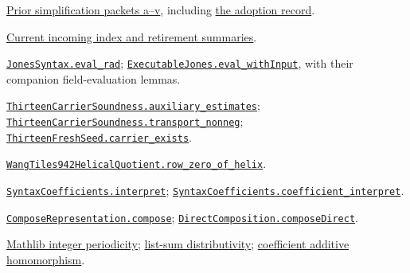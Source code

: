 \documentclass[11pt,letterpaper]{article}
\newcommand{\code}[1]{\nolinkurl{#1}}
\newcommand{\source}[2]{\href{https://github.com/VladimirReshetnikov/ProveIt/blob/efa64ca941cdae37bb6f7fc5093ae8bb69296ca3/Computability/DiophantineConsistency/Lean/DiophantineConsistency/#1.lean}{\code{#1.#2}}}
\begin{document}
\begin{enumerate}[label={[S\arabic*]},leftmargin=2.8em]
\item \href{https://github.com/VladimirReshetnikov/ProveIt/tree/efa64ca941cdae37bb6f7fc5093ae8bb69296ca3/Computability/DiophantineConsistency/research/lean-proof-simplification}{Prior simplification packets a--v}, including \href{https://github.com/VladimirReshetnikov/ProveIt/blob/efa64ca941cdae37bb6f7fc5093ae8bb69296ca3/Computability/DiophantineConsistency/research/lean-proof-simplification/ADOPTION.md}{the adoption record}.
\item \href{https://github.com/VladimirReshetnikov/ProveIt/blob/efa64ca941cdae37bb6f7fc5093ae8bb69296ca3/docs/incoming/README.md}{Current incoming index and retirement summaries}.
\item \source{JonesSyntax}{eval_rad}; \source{ExecutableJones}{eval_withInput}, with their companion field-evaluation lemmas.
\item \source{ThirteenCarrierSoundness}{auxiliary_estimates}; \source{ThirteenCarrierSoundness}{transport_nonneg}; \source{ThirteenFreshSeed}{carrier_exists}.
\item \source{WangTiles942HelicalQuotient}{row_zero_of_helix}.
\item \source{SyntaxCoefficients}{interpret}; \source{SyntaxCoefficients}{coefficient_interpret}.
\item \source{ComposeRepresentation}{compose}; \source{DirectComposition}{composeDirect}.
\item \href{https://github.com/leanprover-community/mathlib4/blob/81a5d257c8e410db227a6665ed08f64fea08e997/Mathlib/Algebra/Ring/Periodic.lean}{Mathlib integer periodicity}; \href{https://github.com/leanprover-community/mathlib4/blob/81a5d257c8e410db227a6665ed08f64fea08e997/Mathlib/Algebra/BigOperators/Ring/List.lean}{list-sum distributivity}; \href{https://github.com/leanprover-community/mathlib4/blob/81a5d257c8e410db227a6665ed08f64fea08e997/Mathlib/Algebra/MvPolynomial/Basic.lean}{coefficient additive homomorphism}.
\end{enumerate}
\end{document}
